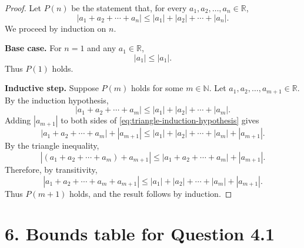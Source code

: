 \documentclass[11pt]{article}
\begin{document}
\begin{proof}
Let \(P(n)\) be the statement that, for every \(a_1,a_2,\ldots,a_n\in\mathbb{R}\),
\[
\left|a_1+a_2+\cdots+a_n\right|
\leq |a_1|+|a_2|+\cdots+|a_n|.
\]
We proceed by induction on \(n\).

\textbf{Base case.} For \(n=1\) and any \(a_1\in\mathbb{R}\),
\[
|a_1|\leq |a_1|.
\]
Thus \(P(1)\) holds.

\textbf{Inductive step.} Suppose \(P(m)\) holds for some \(m\in\mathbb{N}\).
Let \(a_1,a_2,\ldots,a_{m+1}\in\mathbb{R}\).
By the induction hypothesis,
\begin{equation}\label{eq:triangle-induction-hypothesis}
\left|a_1+a_2+\cdots+a_m\right|
\leq |a_1|+|a_2|+\cdots+|a_m|.
\end{equation}
Adding \(|a_{m+1}|\) to both sides of \eqref{eq:triangle-induction-hypothesis} gives
\[
\left|a_1+a_2+\cdots+a_m\right|+|a_{m+1}|
\leq |a_1|+|a_2|+\cdots+|a_m|+|a_{m+1}|.
\]
By the triangle inequality,
\[
\left|(a_1+a_2+\cdots+a_m)+a_{m+1}\right|
\leq \left|a_1+a_2+\cdots+a_m\right|+|a_{m+1}|.
\]
Therefore, by transitivity,
\[
\left|a_1+a_2+\cdots+a_m+a_{m+1}\right|
\leq |a_1|+|a_2|+\cdots+|a_m|+|a_{m+1}|.
\]
Thus \(P(m+1)\) holds, and the result follows by induction.
\end{proof}

\section*{6. Bounds table for Question 4.1}
\end{document}

